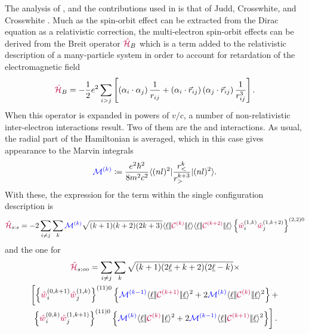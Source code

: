 \documentclass[11pt, twoside,openright]{article}
\begin{document}
    The analysis of \soo, and the \spinspin contributions used in  \qlanth is that of Judd, Crosswhite, and Crosswhite \cite{judd_intra-atomic_1968}. Much as the spin-orbit effect can be extracted from the Dirac equation as a relativistic correction, the multi-electron spin-orbit effects can be derived from the Breit operator $\textcolor{purple}{\hat{\mathcal{H}}}_B$  \cite{bethe_quantum_1957} which is a term added to the relativistic description of a many-particle system in order to account for retardation of the electromagnetic field
    \begin{equation}
    \textcolor{purple}{\hat{\mathcal{H}}}_B = -\frac{1}{2}e^2 \sum_{i>j} \left[ \left(\alpha_i\cdot\alpha_j\right)\frac{1}{r_{ij}} + \left(\alpha_i\cdot{\vec{r}_{ij}}\right)\left(\alpha_j\cdot\vec{r}_{ij}\right) \frac{1}{r_{ij}^3} \right].
    \end{equation}
    When this operator is expanded in powers of $v/c$, a number of non-relativistic inter-electron interactions result. Two of them are the \soo and \spinspin interactions.
    As usual, the radial part of the Hamiltonian is averaged, which in this case gives appearance to the Marvin integrals 
    \begin{equation} 
    \textcolor{blue}{\mathcal{M}^{(k)}} \coloneqq \frac{e^2\hbar^2}{8m^2c^2} \langle (nl)^2|\frac{r_<^k}{r_>^{k+3}}|(nl)^2\rangle.
    \end{equation}
     With these, the expression for the \spinspin term within the single configuration description is \cite{judd_intra-atomic_1968}
    \begin{multline}
    \textcolor{purple}{\hat{\mathcal{H}}}_{s:s} = -2 \sum_{i\neq{j}}
        \sum_k \textcolor{blue}{\mathcal{M}^{(k)}}
            \sqrt{(k+1)(k+2)(2k+3)} 
            \langle \underbar{$\ell$}|\!|\textcolor{purple}{\mathcal{C}^{(k)}}|\!|\underbar{$\ell$}\rangle 
            \langle \underbar{$\ell$}|\!|\textcolor{purple}{\mathcal{C}^{(k+2)}}|\!|\underbar{$\ell$}\rangle
            \left\{
                \textcolor{purple}{\hat{w}}_{i}^{({1},{k})}
                \textcolor{purple}{\hat{w}}_{j}^{({1},{k+2})}
            \right\}^{(2,2)0}
    \end{multline}
    and the one for \soo {}
    \begin{multline}
        \ham_{s:oo} = \sum_{i\neq{j}} 
            \sum_k 
                \sqrt{(k+1)(2\lorb+k+2)(2\lorb-k)}  \times \\ 
        \left[ \left\{ \wdouble{i}{0}{k+1} \wdouble{j}{1}{k} \right\}^{(11)0} 
        \left\{ \Mk{k-1}
            \redbraopket{\lorb}
                {\Ck{k+1}}
                {\lorb}^2
            +
            2 \Mk{k} \redbraopket{\lorb}{\Ck{k}}{\lorb}^2
        \right\} + \right. \\
        \left.
            \left\{ \wdouble{i}{0}{k}\wdouble{j}{1}{k+1} \right\}^{(11)0} 
                \left\{ \Mk{k} 
                    \redbraopket{\lorb}{\Ck{k}}{\lorb}^2
                    + 2 \Mk{k-1}
                    \redbraopket{\lorb}{\Ck{k+1}}{\lorb}^2
                \right\}
        \right].
    \end{multline} 
\end{document}
